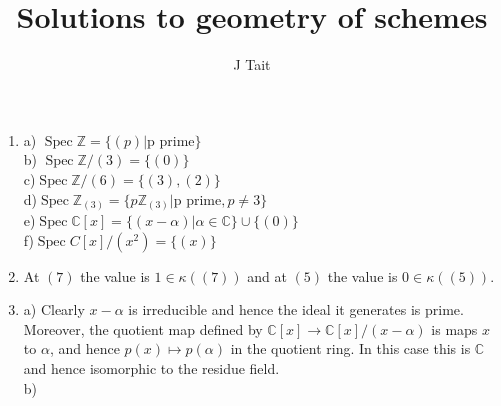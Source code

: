 \documentclass[11pt]{article} %
\title{Solutions to geometry of schemes}
\author{J Tait}
\DeclareMathOperator{\spec}{Spec}
\begin{document}
\maketitle

\begin{enumerate}
\item 
a) $\spec \mathbb{Z}=\{(p)|\mbox{p prime}\}$\\
b) $\spec \mathbb{Z}/(3)=\{(0)\}$\\
c)$\spec \mathbb{Z}/(6)=\{(3),(2)\}$\\
d)$\spec \mathbb{Z}_{(3)}=\{p\mathbb{Z}_{(3)}|\mbox{p prime},p\neq 3\}$\\
e)$\spec \mathbb{C}[x]=\{(x-\alpha)|\alpha\in \mathbb{C}\}\cup \{(0)\}$\\
f)$\spec{C}[x]/(x^2)=\{(x)\}$

\item
At $(7)$ the value is $1 \in \kappa((7))$ and at $(5)$ the value is $0\in \kappa ((5))$.

\item
a) Clearly $x-\alpha$ is irreducible and hence the ideal it generates is prime. Moreover, the quotient map defined by $\mathbb{C}[x]\rightarrow \mathbb{C}[x]/(x-\alpha)$ is maps $x$ to $\alpha$, and hence $p(x)\mapsto p(\alpha )$ in the quotient ring. In this case this is $\mathbb{C}$ and hence isomorphic to the residue field.\\
b)
\end{enumerate}







\end{document}
